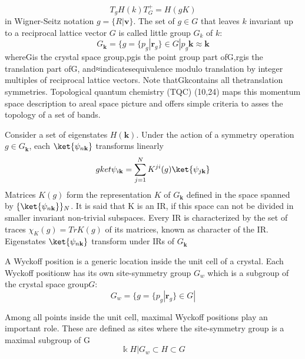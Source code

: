 \begin{equation}
T_g H(k) T_G^+ = H (gK)
\end{equation}
in Wigner-Seitz notation $g = \lbrace R | \mathbf{v} \rbrace$. The set of $g \in G$ that leaves $k$ invariant up to a reciprocal lattice vector $G$ is called little group $G_k$ of $k$:
\begin{equation}
G_{\mathbf{k}} = \lbrace g = \lbrace p_g | \mathbf{r}_g \rbrace \in G | p_g \mathbf{k} \approx \mathbf{k}
\label{eq:littlegroup}
\end{equation}
whereGis the crystal space group,pgis the point group part ofG,rgis the translation part ofG, and≈indicatesequivalence  modulo  translation  by  integer  multiples  of  reciprocal  lattice  vectors.   Note  thatGkcontains  all  thetranslation symmetries.  Topological quantum chemistry (TQC) (10,24) maps this momentum space description to areal space picture and offers simple criteria to asses the topology of a set of bands.

Consider a set of eigenstates $H (\mathbf{k})$. Under the action of a symmetry operation $g \in G_{\mathbf{k}}$, each $\ket{\psi_{n \mathbf{k}}}$ transforms linearly
\begin{equation}
g ket{\psi_{i \mathbf{k}}} = \sum_{j=1}^N K^{ji} (g) \ket{ \psi_{j \mathbf{k}}}
\end{equation}
Matrices $K(g)$ form the representation $K$ of $G_{\mathbf{k}}$ defined in the space spanned by
$\lbrace \ket{\psi_{n \mathbf{k}}} \rbrace_N$. It is said that K is an IR, if this space can not be divided in smaller invariant non-trivial subspaces. Every IR is characterized by the set of traces $\chi_K (g) = Tr K (g)$ of its matrices, known as character of the IR. Eigenstates $\ket{\psi_{n \mathbf{k}}}$ transform under IRs of $G_{\mathbf{k}}$ 

A  Wyckoff  position  is  a  generic  location  inside  the  unit  cell  of  a  crystal.   Each  Wyckoff  positionw has  its  own site-symmetry group $G_w$ which is a subgroup of the crystal space group$G$:
\begin{equation}
G_w = \lbrace g = \lbrace p_g | \mathbf{r}_g \rbrace \in G |
\label{eq:wyckoff}
\end{equation}

Among all points inside the unit cell, maximal Wyckoff positions play an important role.  These are defined as sites where the site-symmetry group is a maximal subgroup of G
\begin{equation}
\Bbbk H | G_w \subset H \subset G
\end{equation}




